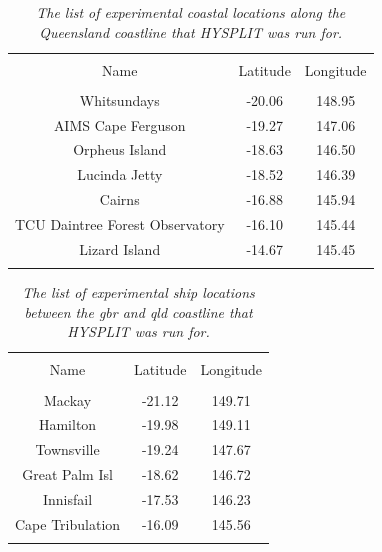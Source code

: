 \begin{table}[tbh!]
	\caption{\textsl{ The list of experimental coastal locations along the Queensland coastline that HYSPLIT was run for. }}
	\centering
		\begin{tabular}{c c c} \\
			\hline \\ [-1ex]
			Name & Latitude & Longitude \\ [1ex]
			\hline \\ [-1ex]
			Whitsundays & -20.06 & 148.95 \\
    		AIMS Cape Ferguson & -19.27 & 147.06 \\
    		Orpheus Island & -18.63 & 146.50 \\
			Lucinda Jetty & -18.52 & 146.39 \\
			Cairns & -16.88 & 145.94 \\
			TCU Daintree Forest Observatory & -16.10 & 145.44 \\
			Lizard Island & -14.67 & 145.45 \\ [1ex]
			\hline \\
		\end{tabular}
	\label{tab:hysplitlocscoast}
\end{table}

\begin{table}[tbh!]
	\caption{\textsl{ The list of experimental ship locations between the \gls{gbr} and \gls{qld} coastline that HYSPLIT was run for. }}
	\centering
		\begin{tabular}{c c c} \\
			\hline \\ [-1ex]
			Name & Latitude & Longitude \\ [1ex]
			\hline \\ [-1ex]
			Mackay & -21.12 & 149.71 \\
			Hamilton & -19.98 & 149.11 \\
			Townsville & -19.24 & 147.67 \\
			Great Palm Isl & -18.62 & 146.72 \\
			Innisfail & -17.53 & 146.23 \\
			Cape Tribulation & -16.09 & 145.56 \\ [1ex]
			\hline \\
		\end{tabular}
	\label{tab:hysplitlocsship}
\end{table}

